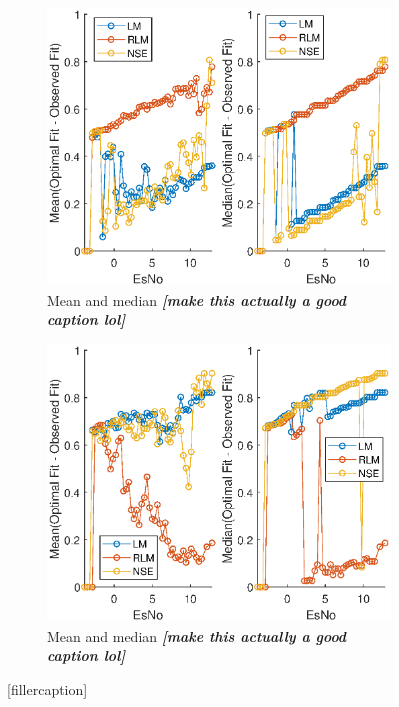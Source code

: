 \begin{figure}[ht]

\begin{subfigure}{0.50\linewidth}
\centering
\includegraphics[scale=0.6]{figures/c_sim_results/sim22_binnedMeanMedian.eps}
\caption{Mean and median \textit{\textbf{[make this actually a good caption lol]}}}
\label{fig:cSimBinMeanMed}
\end{subfigure}%
\begin{subfigure}{0.50\linewidth}
\centering
\includegraphics[scale=0.6]{figures/c_sim_results/sim22_binnedMeanMedian_powersave.eps}
\caption{Mean and median \textit{\textbf{[make this actually a good caption lol]}}}
\label{fig:cSimBinMeanMedPwr}
\end{subfigure}
\caption{[fillercaption]}
\label{fig:cSimBinMeanMed}
\end{figure}

